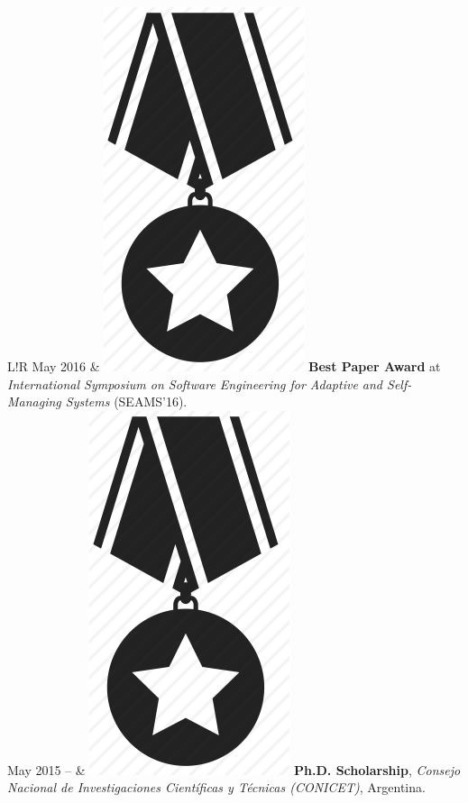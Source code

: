 \documentclass[10pt]{article}
\newcommand\VRule{\color{lightgray}\vrule width 0.5pt}
\begin{document}
\begin{tabular}{L!{\VRule}R}
May 2016 & \includegraphics[scale=0.022]{../img/medal.png}
\textbf{Best Paper Award} at \textit{International Symposium on 
Software Engineering for Adaptive and Self-Managing Systems} (SEAMS'16).\\

May 2015 -- & \includegraphics[scale=0.022]{../img/medal.png} \hspace{-0.85mm} 
\textbf{Ph.D. 
Scholarship}, \textit{Consejo Nacional de 
Investigaciones Cient\'ificas y T\'ecnicas (CONICET)}, Argentina.\\


\end{tabular}
\end{document}
